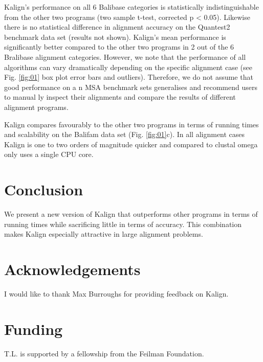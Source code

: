 \documentclass[nocrop]{bioinfo}
\begin{document}
Kalign's performance on all 6 Balibase categories is statistically indistinguishable from the other two programs (two sample t-test, corrected p < 0.05). Likewise there is no statistical difference in alignment accuracy on the Quantest2 benchmark data set (results not shown). Kalign's mean performance is significantly better compared to the other two programs in 2 out of the 6 Bralibase alignment categories. However, we note that the performance of all algorithms can vary dramatically depending on the specific alignment case (see Fig. \ref{fig:01} box plot error bars and outliers). Therefore, we do not assume that good performance on a{\color{red} n} MSA benchmark sets generalises and recommend users to manual{\color{red} ly} inspect their alignments and compare the results of different alignment programs.

Kalign compares favourably to the other two programs in terms of running times and scalability on the Balifam data set (Fig. \ref{fig:01}c). In all alignment cases Kalign is one to two orders of magnitude quicker and compared to clustal omega only uses a single CPU core. 
\section{Conclusion}
We present a new version of Kalign that outperforms other programs in terms of running times while sacrificing little in terms of accuracy. This combination makes Kalign especially attractive in large alignment problems.
\section*{Acknowledgements}
I would like to thank Max Burroughs for providing feedback on Kalign.
\section*{Funding}
T.L. is supported by a fellowship from the Feilman Foundation.

%
%
%
%
%
%

%
%
\end{document}
